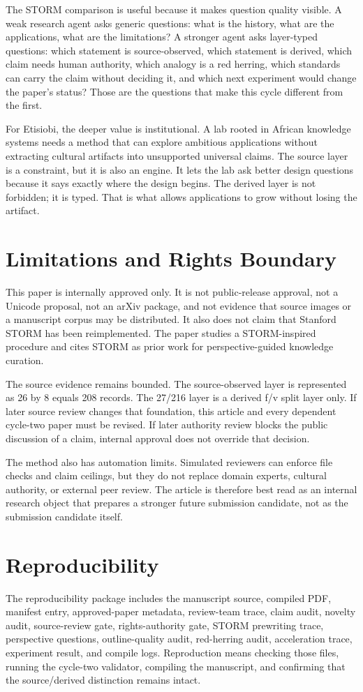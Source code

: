 \documentclass[sigconf,nonacm]{acmart}
\begin{document}
The STORM comparison is useful because it makes question quality visible. A
weak research agent asks generic questions: what is the history, what are the
applications, what are the limitations? A stronger agent asks layer-typed
questions: which statement is source-observed, which statement is derived, which
claim needs human authority, which analogy is a red herring, which standards can
carry the claim without deciding it, and which next experiment would change the
paper's status? Those are the questions that make this cycle different from the
first.

For Etisiobi, the deeper value is institutional. A lab rooted in African
knowledge systems needs a method that can explore ambitious applications
without extracting cultural artifacts into unsupported universal claims. The
source layer is a constraint, but it is also an engine. It lets the lab ask
better design questions because it says exactly where the design begins. The
derived layer is not forbidden; it is typed. That is what allows applications to
grow without losing the artifact.

\section{Limitations and Rights Boundary}
This paper is internally approved only. It is not public-release approval, not a
Unicode proposal, not an arXiv package, and not evidence that source images or a
manuscript corpus may be distributed. It also does not claim that Stanford STORM
has been reimplemented. The paper studies a STORM-inspired procedure and cites
STORM as prior work for perspective-guided knowledge curation.

The source evidence remains bounded. The source-observed layer is represented as
26 by 8 equals 208 records. The 27/216 layer is a derived f/v split layer only.
If later source review changes that foundation, this article and every
dependent cycle-two paper must be revised. If later authority review blocks the
public discussion of a claim, internal approval does not override that decision.

The method also has automation limits. Simulated reviewers can enforce file
checks and claim ceilings, but they do not replace domain experts, cultural
authority, or external peer review. The article is therefore best read as an
internal research object that prepares a stronger future submission candidate,
not as the submission candidate itself.

\section{Reproducibility}
The reproducibility package includes the manuscript source, compiled PDF,
manifest entry, approved-paper metadata, review-team trace, claim audit,
novelty audit, source-review gate, rights-authority gate, STORM prewriting
trace, perspective questions, outline-quality audit, red-herring audit,
acceleration trace, experiment result, and compile logs. Reproduction means
checking those files, running the cycle-two validator, compiling the manuscript,
and confirming that the source/derived distinction remains intact.
\end{document}
